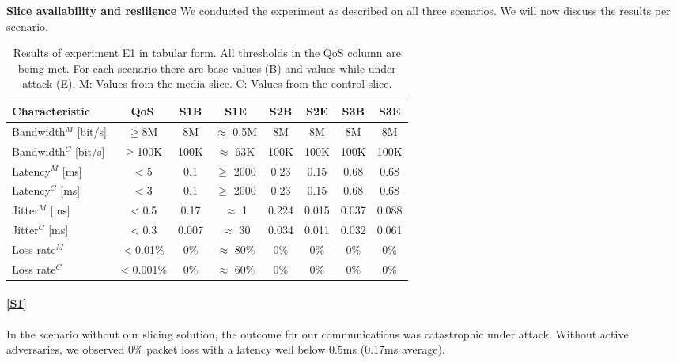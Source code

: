 \begin{description}[style=multiline, labelwidth=0.7cm]
    \item[\ref{E1}] \textbf{Slice availability and resilience} We conducted the experiment as described on all three scenarios. We will now discuss the results per scenario.

    \begin{table}[ht]
        \centering
        \begin{tabular}{|l|c|c|c|c|c|c|c|}
             \hline
             \textbf{Characteristic} & \textbf{QoS} & \textbf{S1B} & \textbf{S1E} & \textbf{S2B} & \textbf{S2E} & \textbf{S3B} & \textbf{S3E} \\
             \hline
             Bandwidth$^M$ [bit/s] & $\geq$8M & 8M & $\approx$ 0.5M & 8M & 8M & 8M & 8M \\
             Bandwidth$^C$ [bit/s] & $\geq$100K & 100K & $\approx$ 63K & 100K & 100K & 100K & 100K \\
             \hline
             Latency$^M$ [ms] & $<$5 & 0.1 & $\geq$ 2000 & 0.23 & 0.15 & 0.68 & 0.68 \\
             Latency$^C$ [ms] & $<$3 & 0.1 & $\geq$ 2000 & 0.23 & 0.15 & 0.68 & 0.68 \\
             \hline
             Jitter$^M$ [ms] & $<$0.5 & 0.17 & $\approx$ 1 & 0.224 & 0.015 & 0.037 & 0.088 \\
             Jitter$^C$ [ms] & $<$0.3 & 0.007 & $\approx$ 30 & 0.034 & 0.011 & 0.032 & 0.061 \\
             \hline
             Loss rate$^M$ & $<$0.01\% & 0\% & $\approx$ 80\% & 0\% & 0\% & 0\% & 0\% \\
             Loss rate$^C$ & $<$0.001\% & 0\% & $\approx$ 60\% & 0\% & 0\% & 0\% & 0\% \\
             \hline
        \end{tabular}
        \caption[Results of experiment E1]{Results of experiment E1 in tabular form. All thresholds in the QoS column are being met. For each scenario there are base values (B) and values while under attack (E). M: Values from the media slice. C: Values from the control slice.}
        \label{table:validation_qos_results}
    \end{table}

    \paragraph{\ref{S1}} In the scenario without our slicing solution, the outcome for our communications was catastrophic under attack. Without active adversaries, we observed 0\% packet loss with a latency well below 0.5ms (0.17ms average).


\end{description}
